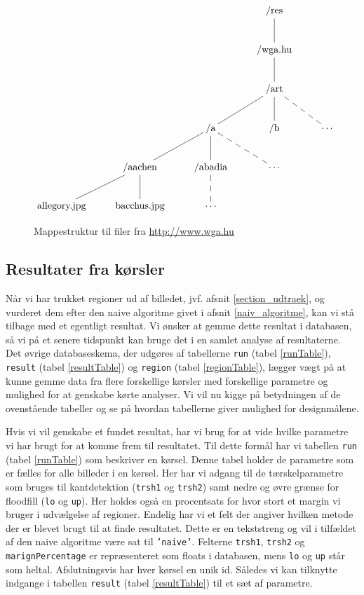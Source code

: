 {%
\begin{figure}[!h]
    \centering
$
\xymatrix{
 &  &   & \ar @{-} [d] \textrm{/res}  &                                                     \\
 &  &   & \ar @{-} [d] \textrm{/wga.hu}  &                                                  \\
 &  &   & \ar @{-} [dl] \ar @{-} [d] \ar @{--} [dr] \textrm{/art} &                         \\
 &  & \ar @{-} [dl] \ar @{-} [d] \ar @{--} [dr] \textrm{/a} & \textrm{/b} & \cdots          \\
 & \ar @{-} [dl] \ar @{-} [d] \textrm{/aachen} & \ar @{--} [d] \textrm{/abadia} & \cdots    \\
\textrm{allegory.jpg} & \textrm{bacchus.jpg} & \cdots &   &
}
$
    \caption{Mappestruktur til filer fra
        \href{http://www.wga.hu}{http://www.wga.hu}}
    \label{mappestruktur}
\end{figure}

\subsection{Resultater fra kørsler\label{section_results}}
Når vi har trukket regioner ud af billedet, jvf. afsnit
\ref{section_udtraek}, og vurderet dem efter den naive algoritme givet i
afsnit \ref{naiv_algoritme}, kan vi stå tilbage med et egentligt
resultat. Vi ønsker at gemme dette resultat i databasen, så vi på et
senere tidspunkt kan bruge det i en samlet analyse af resultaterne. Det
øvrige databaseskema, der udgøres af tabellerne \texttt{run} (tabel
\ref{runTable}), \texttt{result} (tabel \ref{resultTable}) og
\texttt{region} (tabel \ref{regionTable}), lægger vægt på at kunne gemme
data fra flere forskellige kørsler med forskellige parametre og mulighed
for at genskabe kørte analyser. Vi vil nu kigge på betydningen af de
ovenstående tabeller og se på hvordan tabellerne giver mulighed for
designmålene.

Hvis vi vil genskabe et fundet resultat, har vi brug for at vide hvilke
parametre vi har brugt for at komme frem til resultatet. Til dette
formål har vi tabellen \texttt{run} (tabel \ref{runTable}) som beskriver
en kørsel. Denne tabel holder de parametre som er fælles for alle
billeder i en kørsel. Her har vi adgang til de tærskelparametre som
bruges til kantdetektion (\texttt{trsh1} og \texttt{trsh2}) samt nedre
og øvre grænse for floodfill (\texttt{lo} og \texttt{up}). Her holdes
også en procentsats for hvor stort et margin vi bruger i udvælgelse af
regioner. Endelig har vi et felt der angiver hvilken metode der er
blevet brugt til at finde resultatet. Dette er en tekststreng og vil i
tilfældet af den naive algoritme være sat til \texttt{'naive'}. Felterne
\texttt{trsh1}, \texttt{trsh2} og \texttt{marignPercentage} er
repræsenteret som floats i databasen, mens \texttt{lo} og \texttt{up}
står som heltal. Afslutningsvis har hver kørsel en unik id. Således vi
kan tilknytte indgange i tabellen \texttt{result} (tabel
\ref{resultTable}) til et sæt af parametre.

}
